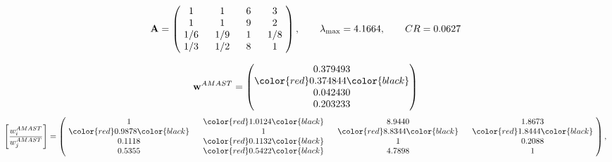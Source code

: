 \begin{example}
\begin{equation*}
\mathbf{A} =
\begin{pmatrix}
$\,\,$ 1 $\,\,$ & $\,\,$1$\,\,$ & $\,\,$6$\,\,$ & $\,\,$3 $\,\,$ \\
$\,\,$ 1 $\,\,$ & $\,\,$ 1 $\,\,$ & $\,\,$9$\,\,$ & $\,\,$2 $\,\,$ \\
$\,\,$ 1/6$\,\,$ & $\,\,$ 1/9$\,\,$ & $\,\,$ 1 $\,\,$ & $\,\,$ 1/8 $\,\,$ \\
$\,\,$ 1/3$\,\,$ & $\,\,$ 1/2$\,\,$ & $\,\,$8$\,\,$ & $\,\,$ 1  $\,\,$ \\
\end{pmatrix},
\qquad
\lambda_{\max} =
4.1664,
\qquad
CR = 0.0627
\end{equation*}

\begin{equation*}
\mathbf{w}^{AMAST} =
\begin{pmatrix}
0.379493\\
\color{red} 0.374844\color{black} \\
0.042430\\
0.203233
\end{pmatrix}\end{equation*}
\begin{equation*}
\left[ \frac{{w}^{AMAST}_i}{{w}^{AMAST}_j} \right] =
\begin{pmatrix}
$\,\,$ 1 $\,\,$ & $\,\,$\color{red} 1.0124\color{black} $\,\,$ & $\,\,$8.9440$\,\,$ & $\,\,$1.8673$\,\,$ \\
$\,\,$\color{red} 0.9878\color{black} $\,\,$ & $\,\,$ 1 $\,\,$ & $\,\,$\color{red} 8.8344\color{black} $\,\,$ & $\,\,$\color{red} 1.8444\color{black}   $\,\,$ \\
$\,\,$0.1118$\,\,$ & $\,\,$\color{red} 0.1132\color{black} $\,\,$ & $\,\,$ 1 $\,\,$ & $\,\,$0.2088 $\,\,$ \\
$\,\,$0.5355$\,\,$ & $\,\,$\color{red} 0.5422\color{black} $\,\,$ & $\,\,$4.7898$\,\,$ & $\,\,$ 1  $\,\,$ \\
\end{pmatrix},
\end{equation*}


\end{example}
